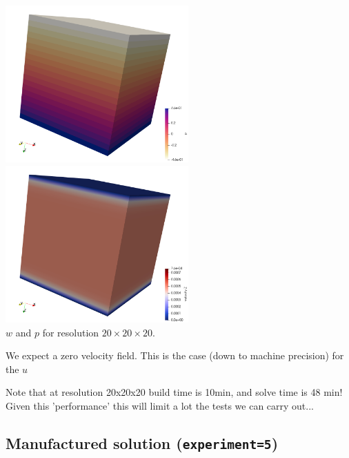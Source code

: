 \begin{center}
\includegraphics[width=7cm]{python_codes/fieldstone_10/resultsQ2/exp0/press}
\includegraphics[width=7cm]{python_codes/fieldstone_10/resultsQ2/exp0/w}\\
{\captionfont $w$ and $p$ for resolution $20\times 20 \times 20$.}
\end{center}

We expect a zero velocity field. This is the case (down to machine precision) for the $u$

Note that at resolution 20x20x20 build time is 10min, and solve time is 48 min!
Given this 'performance' this will limit a lot the tests we can carry out...

\subsection*{Manufactured solution ({\tt experiment=5})}

